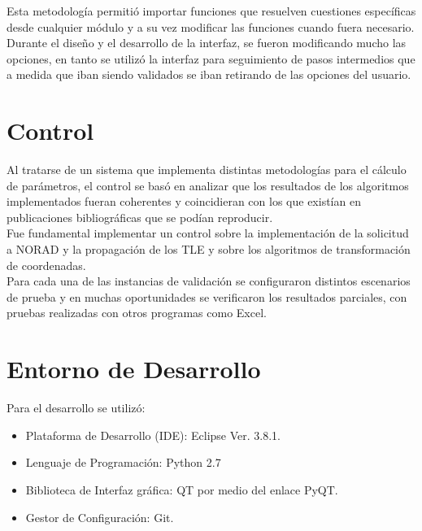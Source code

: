 Esta metodolog\'ia permiti\'o importar funciones que resuelven cuestiones espec\'ificas desde cualquier  m\'odulo y a su vez modificar las funciones cuando fuera necesario.\\
Durante el diseño y el desarrollo de la interfaz, se fueron modificando mucho las opciones, en tanto se utiliz\'o la interfaz para seguimiento de pasos intermedios que a medida que iban siendo validados se iban retirando de las opciones del usuario.\\

\section{Control}
Al tratarse de un sistema que implementa distintas metodolog\'ias para el c\'alculo de par\'ametros, el control se bas\'o en analizar que los resultados de los algoritmos implementados fueran coherentes y coincidieran con los que exist\'ian en publicaciones bibliogr\'aficas que se pod\'ian reproducir.\\
Fue fundamental implementar un control sobre la implementaci\'on de la solicitud a NORAD y la propagaci\'on de los TLE y sobre los algoritmos de transformaci\'on de coordenadas.\\
Para cada una de las instancias de validaci\'on se configuraron distintos escenarios de prueba y en muchas oportunidades se verificaron los resultados parciales, con pruebas realizadas con otros programas como Excel.\\

\section{Entorno de Desarrollo}

Para el desarrollo se utiliz\'o:\\
\begin{itemize}
 \item Plataforma de Desarrollo (\ac{IDE}): Eclipse Ver. 3.8.1.
 \item Lenguaje de Programaci\'on: Python 2.7
 \item Biblioteca de Interfaz gr\'afica: QT por medio del enlace PyQT.
 \item Gestor de Configuraci\'on: Git.
\end{itemize}

